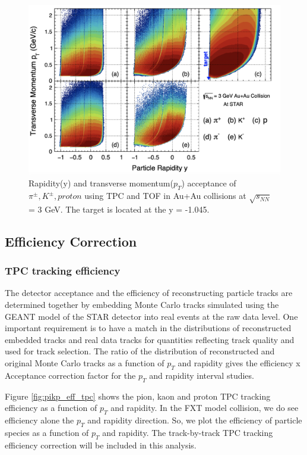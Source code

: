 \begin{figure}[ht]
\includegraphics [scale=0.5]{chapter2/fig/pikp_acc_3gev.png}
\caption{ Rapidity(y) and transverse momentum($p_{T}$) acceptance of $\pi^{\pm}, K^{\pm}, proton$ using TPC and TOF in Au+Au collisions at $\sqrt{s_{NN}}$ = 3 GeV. The target is located at the y = -1.045. }
\label{fig:pikp_acceptance_fig}
\end{figure}

\clearpage
\newpage

\subsection{Efficiency Correction}

\subsubsection{TPC tracking efficiency}

The detector acceptance and the efficiency of reconstructing particle tracks are determined together by embedding Monte Carlo tracks simulated using the GEANT model \cite{Agostinelli:2002hh} of the STAR detector into real events at the raw data level. One important requirement is to have a match in the distributions of reconstructed embedded tracks and real data tracks for quantities reflecting track quality and used for track selection. The ratio of the distribution of reconstructed and original Monte Carlo tracks as a function of $p_{T}$ and rapidity gives the efficiency x Acceptance correction factor for the $p_{T}$ and rapidity interval studies. 
	
Figure \ref{fig:pikp_eff_tpc} shows the pion, kaon and proton TPC tracking efficiency as a function of $p_{T}$ and rapidity. In the FXT model collision, we do see efficiency alone the $p_{T}$ and rapidity direction. So, we plot the efficiency of particle species as a function of $p_{T}$ and rapidity. The track-by-track TPC tracking efficiency correction will be included in this analysis.

